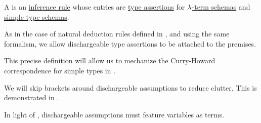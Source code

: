 \begin{definition}\label{def:simple_typing_rule}\mimprovised
  A  is an \hyperref[def:inference_rule]{inference rule} whose entries are \hyperref[def:type_assertion]{type assertions} for \hyperref[def:lambda_term_schema]{\( {\mathrm \lambda} \)-term schemas} and \hyperref[def:simple_type_schema]{simple type schemas}.

  As in the case of natural deduction rules defined in , and using the same formalism, we allow dischargeable type assertions to be attached to the premises.
\end{definition}
\begin{comments}
  \item This precise definition will allow us to mechanize the Curry-Howard correspondence for simple types in .

  \item We will skip brackets around dischargeable assumptions to reduce clutter. This is demonstrated in .

  \item In light of , dischargeable assumptions must feature variables as terms.
\end{comments}

